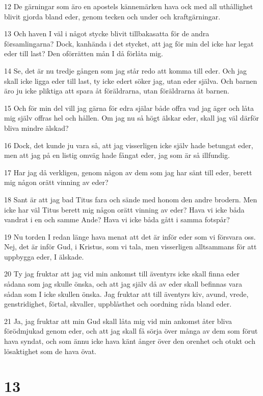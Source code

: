 \par 12 De gärningar som äro en apostels kännemärken hava ock med all uthållighet blivit gjorda bland eder, genom tecken och under och kraftgärningar.
\par 13 Och haven I väl i något stycke blivit tillbakasatta för de andra församlingarna? Dock, kanhända i det stycket, att jag för min del icke har legat eder till last? Den oförrätten mån I då förlåta mig.
\par 14 Se, det är nu tredje gången som jag står redo att komma till eder. Och jag skall icke ligga eder till last, ty icke edert söker jag, utan eder själva. Och barnen äro ju icke pliktiga att spara åt föräldrarna, utan föräldrarna åt barnen.
\par 15 Och för min del vill jag gärna för edra själar både offra vad jag äger och låta mig själv offras hel och hållen. Om jag nu så högt älskar eder, skall jag väl därför bliva mindre älskad?
\par 16 Dock, det kunde ju vara så, att jag visserligen icke själv hade betungat eder, men att jag på en listig omväg hade fångat eder, jag som är så illfundig.
\par 17 Har jag då verkligen, genom någon av dem som jag har sänt till eder, berett mig någon orätt vinning av eder?
\par 18 Sant är att jag bad Titus fara och sände med honom den andre brodern. Men icke har väl Titus berett mig någon orätt vinning av eder? Hava vi icke båda vandrat i en och samme Ande? Hava vi icke båda gått i samma fotspår?
\par 19 Nu torden I redan länge hava menat att det är inför eder som vi försvara oss. Nej, det är inför Gud, i Kristus, som vi tala, men visserligen alltsammans för att uppbygga eder, I älskade.
\par 20 Ty jag fruktar att jag vid min ankomst till äventyrs icke skall finna eder sådana som jag skulle önska, och att jag själv då av eder skall befinnas vara sådan som I icke skullen önska. Jag fruktar att till äventyrs kiv, avund, vrede, genstridighet, förtal, skvaller, uppblåsthet och oordning råda bland eder.
\par 21 Ja, jag fruktar att min Gud skall låta mig vid min ankomst åter bliva förödmjukad genom eder, och att jag skall få sörja över många av dem som förut hava syndat, och som ännu icke hava känt ånger över den orenhet och otukt och lösaktighet som de hava övat.

\chapter{13}

